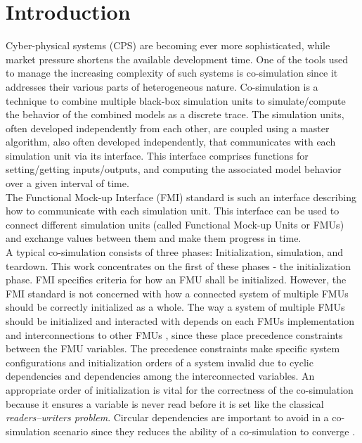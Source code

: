 \section{Introduction}\label{sc:introduction}
Cyber-physical systems (CPS) are becoming ever more sophisticated, while market pressure shortens the available development time. One of the tools used to manage the increasing complexity of such systems is co-simulation since it addresses their various parts of heterogeneous nature. Co-simulation is a technique to combine multiple black-box simulation units to simulate/compute the behavior of the combined models as a discrete trace\cite{Kubler2000}. The simulation units, often developed independently from each other, are coupled using a master algorithm, also often developed independently,
that communicates with each simulation unit via its interface. This interface comprises functions for setting/getting inputs/outputs, and computing the associated model behavior over a given interval of time. \\
The Functional Mock-up Interface (FMI) standard \cite{Blochwitz2012, fmi_2019} is such an interface describing how to communicate with each simulation unit. This interface can be used to connect different simulation units (called Functional Mock-up Units or FMUs) and exchange values between them and make them progress in time. \\
A typical co-simulation consists of three phases: Initialization, simulation, and teardown. This work concentrates on the first of these phases - the initialization phase. FMI specifies criteria for how an FMU shall be initialized. However, the FMI standard is not concerned with how a connected system of multiple FMUs should be correctly initialized as a whole. 
The way a system of multiple FMUs should be initialized and interacted with depends on each FMUs implementation and interconnections to other FMUs \cite{gomes_lucio_vangheluwe_2019}, since these place precedence constraints between the FMU variables. The precedence constraints make specific system configurations and initialization orders of a system invalid due to cyclic dependencies and dependencies among the interconnected variables. An appropriate order of initialization is vital for the correctness of the co-simulation \cite{Thule2018} because it ensures a variable is never read before it is set like the classical \textit{readers–writers problem}. Circular dependencies are important to avoid in a co-simulation scenario since they reduces the ability of a co-simulation to converge \cite{Amalio2016CheckingCo-simulation, BromanCompositionCo-Simulation}.\\

